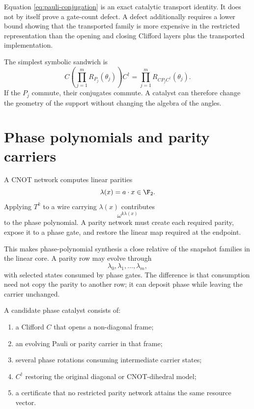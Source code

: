 \begin{provedbox}
Equation \eqref{eq:pauli-conjugation} is an exact catalytic transport identity.  It does not by itself prove a gate-count defect.  A defect additionally requires a lower bound showing that the transported family is more expensive in the restricted representation than the opening and closing Clifford layers plus the transported implementation.
\end{provedbox}

The simplest symbolic sandwich is
\[
C\left(\prod_{j=1}^m R_{P_j}(\theta_j)\right)C^\dagger
=
\prod_{j=1}^m R_{CP_jC^\dagger}(\theta_j).
\]
If the $P_j$ commute, their conjugates commute.  A catalyst can therefore change the geometry of the support without changing the algebra of the angles.

\section{Phase polynomials and parity carriers}
A CNOT network computes linear parities
\[
\lambda(x)=a\cdot x\in\F_2.
\]
Applying $T^k$ to a wire carrying $\lambda(x)$ contributes
\[
\omega^{k\lambda(x)}
\]
to the phase polynomial.  A parity network must create each required parity, expose it to a phase gate, and restore the linear map required at the endpoint.

This makes phase-polynomial synthesis a close relative of the snapshot families in the linear core.  A parity row may evolve through
\[
\lambda_0,\lambda_1,\ldots,\lambda_m,
\]
with selected states consumed by phase gates.  The difference is that consumption need not copy the parity to another row; it can deposit phase while leaving the carrier unchanged.

\begin{skeletonbox}
A candidate phase catalyst consists of:
\begin{enumerate}
\item a Clifford $C$ that opens a non-diagonal frame;
\item an evolving Pauli or parity carrier in that frame;
\item several phase rotations consuming intermediate carrier states;
\item $C^\dagger$ restoring the original diagonal or CNOT-dihedral model;
\item a certificate that no restricted parity network attains the same resource vector.
\end{enumerate}
\end{skeletonbox}

